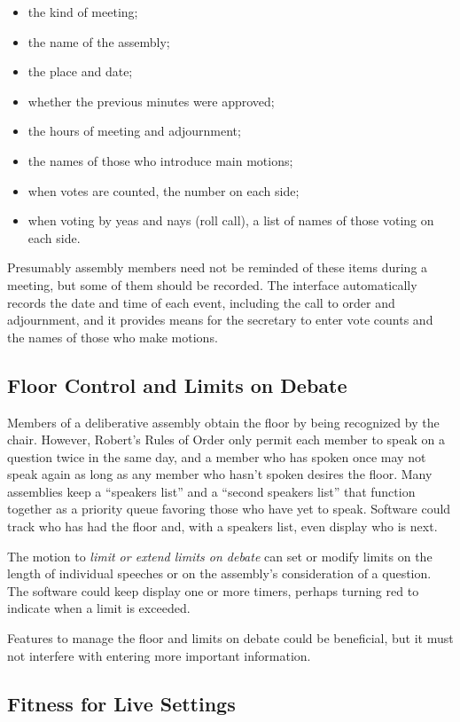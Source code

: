 \documentclass{acm_proc_article-sp}
\begin{document}
\begin{itemize}
\item the kind of meeting;
\item the name of the assembly;
\item the place and date;
\item whether the previous minutes were approved;
\item the hours of meeting and adjournment;
\item the names of those who introduce main motions;
\item when votes are counted, the number on each side;
\item when voting by yeas and nays (roll call), a list of names of those voting on each side.
\end{itemize}
  
Presumably assembly members need not be reminded of these items during a meeting, but some of them should be recorded. The interface automatically records the date and time of each event, including the call to order and adjournment, and it provides means for the secretary to enter vote counts and the names of those who make motions.

\subsection{Floor Control and Limits on Debate}

Members of a deliberative assembly obtain the floor by being recognized by the chair. However, Robert's Rules of Order only permit each member to speak on a question twice in the same day, and a member who has spoken once may not speak again as long as any member who hasn't spoken desires the floor. Many assemblies keep a ``speakers list'' and a ``second speakers list'' that function together as a priority queue favoring those who have yet to speak. Software could track who has had the floor and, with a speakers list, even display who is next.

The motion to \emph{limit or extend limits on debate} can set or modify limits on the length of individual speeches or on the assembly's consideration of a question. The software could keep display one or more timers, perhaps turning red to indicate when a limit is exceeded.

Features to manage the floor and limits on debate could be beneficial, but it must not interfere with entering more important information.

\subsection{Fitness for Live Settings}
\label{sec:live-setting}
\end{document}

